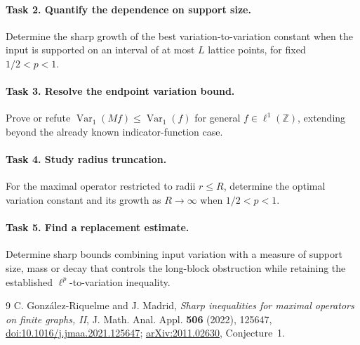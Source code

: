 \documentclass[11pt]{article}
\DeclareMathOperator{\Var}{Var}
\begin{document}
\paragraph{Task 2. Quantify the dependence on support size.}
Determine the sharp growth of the best variation-to-variation constant
when the input is supported on an interval of at most \(L\) lattice
points, for fixed \(1/2<p<1\).

\paragraph{Task 3. Resolve the endpoint variation bound.}
Prove or refute \(\Var_1(Mf)\leq\Var_1(f)\) for general
\(f\in\ell^1(\mathbb Z)\), extending beyond the already known
indicator-function case.

\paragraph{Task 4. Study radius truncation.}
For the maximal operator restricted to radii \(r\leq R\), determine
the optimal variation constant and its growth as \(R\to\infty\)
when \(1/2<p<1\).

\paragraph{Task 5. Find a replacement estimate.}
Determine sharp bounds combining input variation with a measure of
support size, mass or decay that controls the long-block obstruction
while retaining the established \(\ell^p\)-to-variation inequality.

\begin{thebibliography}{9}
C. Gonz\'alez-Riquelme and J. Madrid,
\emph{Sharp inequalities for maximal operators on finite graphs, II},
J. Math. Anal. Appl. \textbf{506} (2022), 125647,
\href{https://doi.org/10.1016/j.jmaa.2021.125647}{doi:10.1016/j.jmaa.2021.125647};
\href{https://arxiv.org/abs/2011.02630}{arXiv:2011.02630}, Conjecture~1.
\end{thebibliography}
\end{document}
